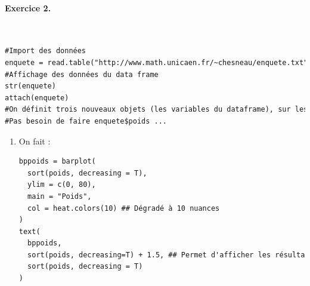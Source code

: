 \paragraph{Exercice 2. }\textcolor{white}{.}\newline
\begin{lstlisting}[language=html]
#Import des données 
enquete = read.table("http://www.math.unicaen.fr/~chesneau/enquete.txt",header = T)
#Affichage des données du data frame
str(enquete)
attach(enquete)
#On définit trois nouveaux objets (les variables du dataframe), sur lesquels on pourra faire appel directement
#Pas besoin de faire enquete$poids ...
\end{lstlisting}
\begin{enumerate}
\item On fait :
\begin{lstlisting}[language=html]
bppoids = barplot(
  sort(poids, decreasing = T), 
  ylim = c(0, 80), 
  main = "Poids",
  col = heat.colors(10) ## Dégradé à 10 nuances
)
text(
  bppoids, 
  sort(poids, decreasing=T) + 1.5, ## Permet d'afficher les résultats textuels (1,5 unité au dessus des graphes) 
  sort(poids, decreasing = T)
)


\end{lstlisting}
\end{enumerate}
